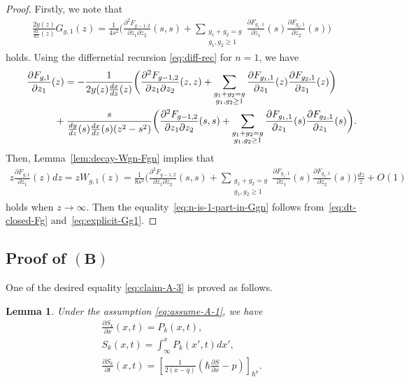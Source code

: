 \documentclass[11pt]{article}
\newtheorem{lem}[thm]{Lemma}
\theoremstyle{definition}
\numberwithin{equation}{section}
\def\p{\partial}
\begin{document}
\begin{proof}
Firstly, we note that
\begin{gather} \label{eq:explicit-Gg1}
\frac{2y(z)}{\frac{dx}{dz}(z)} G_{g,1}(z) =
\frac{1}{4s^{2}}
\biggl(
\frac{\p^{2} F_{g-1,2}}{\p z_{1} \p z_{2}}(s,s) +
\sum_{\substack{g_{1}+g_{2} = g \\ g_{1}, g_{2} \ge 1}}
\frac{\p F_{g_{1}, 1}}{\p z_{1}}(s)
\frac{\p F_{g_{2}, 1}}{\p z_{2}}(s)
\biggr)
\end{gather}
holds. Using the dif\/fernetial recursion \eqref{eq:diff-rec}
for $n=1$, we have
\begin{gather*}
\frac{\p F_{g,1}}{\p z_{1}} (z) =
- \frac{1}{2y(z)\frac{dx}{dz}(z)}
\biggl(
\frac{\p^{2} F_{g-1,2}}{\p z_{1} \p z_{2}}(z,z) +
\sum_{\substack{g_{1}+g_{2} = g \\ g_{1}, g_{2} \ge 1}}
\frac{\p F_{g_{1}, 1}}{\p z_{1}}(z)
\frac{\p F_{g_{2}, 1}}{\p z_{1}}(z)
\biggr)
\\
\hphantom{\frac{\p F_{g,1}}{\p z_{1}} (z) =}{}
+ \frac{s}{\frac{dy}{dz}(s)\frac{dx}{dz}(s)(z^{2}-s^{2})}
\biggl(
\frac{\p^{2} F_{g-1,2}}{\p z_{1} \p z_{2}}(s,s) +
\sum_{\substack{g_{1}+g_{2} = g \\ g_{1}, g_{2} \ge 1}}
\frac{\p F_{g_{1}, 1}}{\p z_{1}}(s)
\frac{\p F_{g_{2}, 1}}{\p z_{1}}(s)
\biggr).
\end{gather*}
Then, Lemma~\ref{lem:decay-Wgn-Fgn}
implies that
\begin{gather*}
z\frac{\p F_{g,1}}{\p z_{1}} (z)dz
= z W_{g,1}(z)  = \frac{1}{8s^{2}} \biggl(
\frac{\p^{2} F_{g-1,2}}{\p z_{1} \p z_{2}}(s,s) +
\sum_{\substack{g_{1}+g_{2} = g \\ g_{1}, g_{2} \ge 1}}
\frac{\p F_{g_{1}, 1}}{\p z_{1}}(s)
\frac{\p F_{g_{2}, 1}}{\p z_{2}}(s)
\biggr) \frac{dz}{z} + O(1)
\end{gather*}
holds when $z \rightarrow \infty$.
Then the equality~\eqref{eq:n-is-1-part-in-Ggn}
follows from~\eqref{eq:dt-closed-Fg} and~\eqref{eq:explicit-Gg1}.
\end{proof}

\subsection[Proof of $(B)$]{Proof of $\boldsymbol{(B)}$}

One of the desired equality \eqref{eq:claim-A-3} is proved as follows.

\begin{lem} \label{prop:integral-for-Sm}
Under the assumption \eqref{eq:assume-A-1}, we have
\begin{gather}
\label{eq:claim-A-5}
\frac{\p S_{k}}{\p x}(x,t)  =   P_{k}(x,t), \\
\label{eq:claim-A-4}
S_{k}(x,t)   =   \int^{x}_{\infty} P_{k}(x',t)dx', \\
\label{eq:claim-A-2}
\frac{\p S_{k}}{\p t}(x,t)   =   \left[\frac{1}{2(x-q)}
\left(\hbar \frac{\p S}{\p x} - p \right) \right]_{\hbar^{k}}.
\end{gather}
\end{lem}
\end{document}
